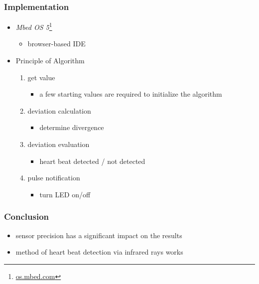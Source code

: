 \documentclass[10pt,xcolor=pdflatex]{beamer}
\begin{document}
\begin{frame}\frametitle{Implementation}
    \begin{itemize}
        \item \textit{Mbed OS 5}\footnote{\href{https://os.mbed.com/}{os.mbed.com}}
            \begin{itemize}
                \item browser-based IDE\\[3em]
            \end{itemize}
        \item Principle of Algorithm
            \begin{enumerate}
                \item get value
                \begin{itemize}
                    \item a few starting values are required to initialize the algorithm\\[1em]
                \end{itemize}
                \item deviation calculation
                \begin{itemize}
                    \item determine divergence\\[1em]
                \end{itemize}
                \item deviation evaluation
                \begin{itemize}
                    \item heart beat detected / not detected\\[1em]
                \end{itemize}
                \item pulse notification
                \begin{itemize}
                    \item turn LED on/off
                \end{itemize}
            \end{enumerate}
    \end{itemize}
\end{frame}

\begin{frame}\frametitle{Conclusion}
    \begin{itemize}
        \item sensor precision has a significant impact on the results\\[2em]
        \item method of heart beat detection via infrared rays works
    \end{itemize}
\end{frame}

\end{document}
